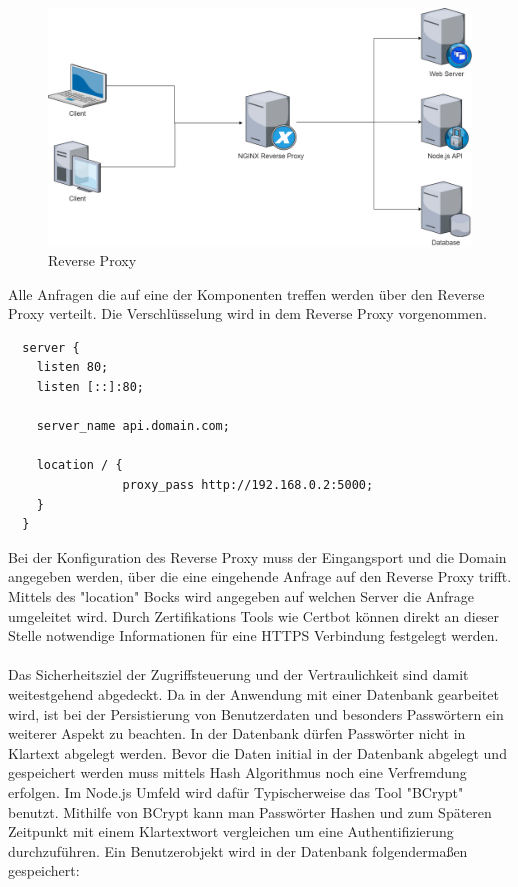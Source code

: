 \documentclass[utf8,biblatex]{lni}
\begin{document}
\begin{figure}
  \centering
  \includegraphics[width=\textwidth]{images/reversep.png}
  \caption[Reverse Proxy]{Reverse Proxy} 
  \label{Reverse-proxy}
\end{figure} 

Alle Anfragen die auf eine der Komponenten treffen werden über den Reverse Proxy verteilt. Die Verschlüsselung wird 
in dem Reverse Proxy vorgenommen. 

\begin{verbatim}
  server {
    listen 80;
    listen [::]:80;

    server_name api.domain.com;

    location / {
                proxy_pass http://192.168.0.2:5000;
    }
  }
\end{verbatim}

Bei der Konfiguration des Reverse Proxy muss der Eingangsport und die Domain angegeben werden, über die eine eingehende Anfrage auf den Reverse Proxy trifft. 
Mittels des "location" Bocks wird angegeben auf welchen Server die Anfrage umgeleitet wird. 
Durch Zertifikations Tools wie Certbot können direkt an dieser Stelle notwendige Informationen für eine HTTPS Verbindung festgelegt werden. 
\\\\
Das Sicherheitsziel der Zugriffsteuerung und der Vertraulichkeit sind damit weitestgehend abgedeckt. 
Da in der Anwendung mit einer Datenbank gearbeitet wird, ist bei der Persistierung von Benutzerdaten und besonders Passwörtern ein weiterer Aspekt zu beachten. 
In der Datenbank dürfen Passwörter nicht in Klartext abgelegt werden. 
Bevor die Daten initial in der Datenbank abgelegt und gespeichert werden muss mittels Hash Algorithmus noch eine Verfremdung erfolgen. 
Im Node.js Umfeld wird dafür Typischerweise das Tool "BCrypt" benutzt. Mithilfe von BCrypt kann man Passwörter Hashen und zum Späteren Zeitpunkt 
mit einem Klartextwort vergleichen um eine Authentifizierung durchzuführen. 
Ein Benutzerobjekt wird in der Datenbank folgendermaßen gespeichert: 
\end{document}
